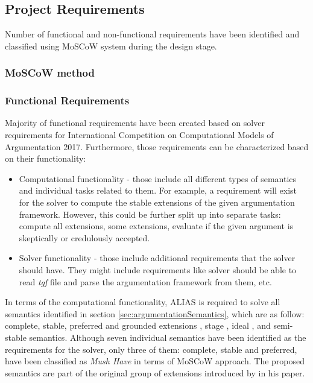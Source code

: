 \subsection{Project Requirements} \label{label:projectRequirements}
Number of functional and non-functional requirements have been identified and classified using MoSCoW system during the design stage. 

\subsubsection{MoSCoW method}

\subsubsection{Functional Requirements}
Majority of functional requirements have been created based on solver requirements for International Competition on Computational Models of Argumentation 2017. Furthermore, those requirements can be characterized based on their functionality:
\begin{itemize}
	\item Computational functionality - those include all different types of semantics and individual tasks related to them. For example, a requirement will exist for the solver to compute the stable extensions of the given argumentation framework. However, this could be further split up into separate tasks: compute all extensions, some extensions, evaluate if the given argument is skeptically or credulously accepted.
	\item Solver functionality - those include additional requirements that the solver should have. They might include requirements like solver should be able to read \textit{tgf} file and parse the argumentation framework from them, etc.
\end{itemize}

In terms of the computational functionality, ALIAS is required to solve all semantics identified in section \ref{sec:argumentationSemantics}, which are as follow: complete, stable, preferred and grounded extensions \citep{dung1995}, stage \citep{verheij1996two}, ideal \citep{dung2007computing}, and semi-stable \citep{caminada2006semi} semantics. Although seven individual semantics have been identified as the requirements for the solver, only three of them: complete, stable and preferred, have been classified as \textit{Mush Have} in terms of MoSCoW approach. The proposed semantics are part of the original group of extensions introduced by \citet{dung1995} in his paper. 

